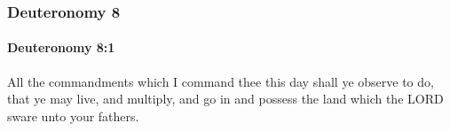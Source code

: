 	\subsubsection{Deuteronomy 8} %
		\label{DEUTERONOMY-8}

		\paragraph{Deuteronomy 8:1} %
			\label{DEUTERONOMY-8-1}

			All the commandments which I command thee this day shall ye observe to do, that ye may live, and multiply, and go in and possess the land which the LORD sware unto your fathers.


